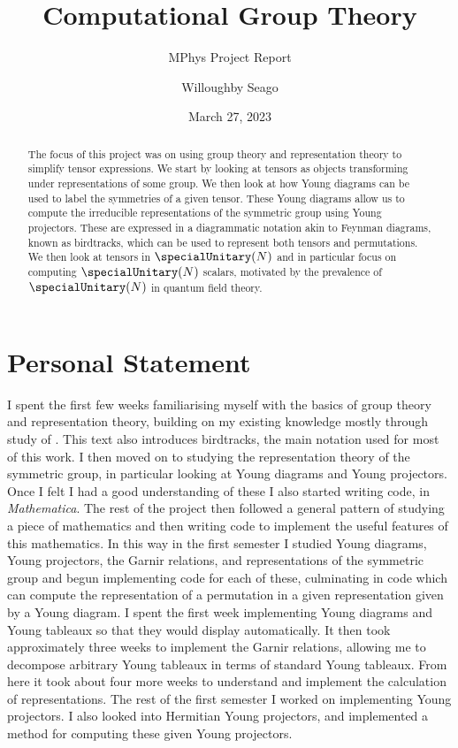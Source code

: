 \documentclass[fleqn]{NotesClass}
\title{Computational Group Theory}
\author{Willoughby Seago}
\date{March 27, 2023}
\subtitle{MPhys Project Report}
\newcommand{\Mathematica}{\textit{Mathematica}}
\begin{document}
    \frontmatter
    \titlepage
    \maketitle
    \begin{abstract}
        The focus of this project was on using group theory and representation theory to simplify tensor expressions.
        We start by looking at tensors as objects transforming under representations of some group.
        We then look at how Young diagrams can be used to label the symmetries of a given tensor.
        These Young diagrams allow us to compute the irreducible representations of the symmetric group using Young projectors.
        These are expressed in a diagrammatic notation akin to Feynman diagrams, known as birdtracks, which can be used to represent both tensors and permutations.
        We then look at tensors in \(\specialUnitary(N)\) and in particular focus on computing \(\specialUnitary(N)\) scalars, motivated by the prevalence of \(\specialUnitary(N)\) in quantum field theory.
    \end{abstract}
    \tableofcontents
    \chapter{Personal Statement}
    I spent the first few weeks familiarising myself with the basics of group theory and representation theory, building on my existing knowledge mostly through study of \cite{cvitanovic}.
    This text also introduces birdtracks, the main notation used for most of this work.
    I then moved on to studying the representation theory of the symmetric group, in particular looking at Young diagrams and Young projectors.
    Once I felt I had a good understanding of these I also started writing code, in \Mathematica{}.
    The rest of the project then followed a general pattern of studying a piece of mathematics and then writing code to implement the useful features of this mathematics.
    In this way in the first semester I studied Young diagrams, Young projectors, the Garnir relations, and representations of the symmetric group and begun implementing code for each of these, culminating in code which can compute the representation of a permutation in a given representation given by a Young diagram.
    I spent the first week implementing Young diagrams and Young tableaux so that they would display automatically.
    It then took approximately three weeks to implement the Garnir relations, allowing me to decompose arbitrary Young tableaux in terms of standard Young tableaux.
    From here it took about four more weeks to understand and implement the calculation of representations.
    The rest of the first semester I worked on implementing Young projectors.
    I also looked into Hermitian Young projectors, and implemented a method for computing these given Young projectors.
    
\end{document}
